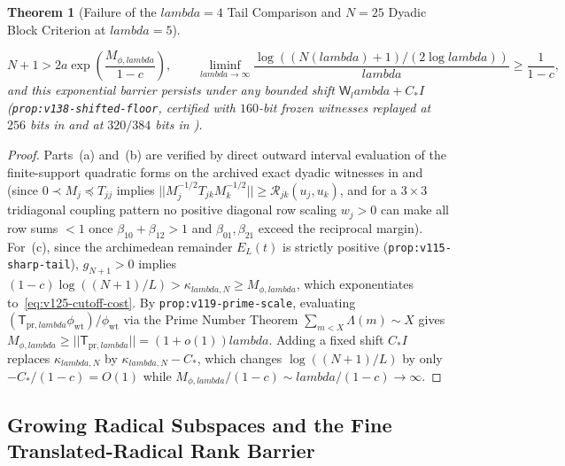 \documentclass[11pt]{article}
\def\lambda{lambda}%
\def\norm#1{||#1||}%
\newtheorem{theorem}{Theorem}[section]
\theoremstyle{remark}
\newcommand{\norm}[1]{\left\lVert #1\right\rVert}
\begin{document}
\begin{theorem}[Failure of the $\lambda = 4$ Tail Comparison and $N = 25$ Dyadic Block Criterion at $\lambda = 5$]
\begin{enumerate}[label=(\alph*)]
  \begin{equation}\label{eq:v125-cutoff-cost}
    N + 1 > 2a\exp\!\left(\frac{M_{\phi,\lambda}}{1-c}\right), \qquad \liminf_{\lambda\to\infty} \frac{\log((N(\lambda)+1)/(2\log\lambda))}{\lambda} \ge \frac{1}{1-c},
  \end{equation}
  and this exponential barrier persists under any bounded shift $\mathsf{W}_\lambda + C_* I$ (\texttt{prop:v138-\allowbreak shifted-\allowbreak floor}, certified with $160$-bit frozen witnesses replayed at $256$ bits in  and at $320/384$ bits in ).
\end{enumerate}
\end{theorem}
\begin{proof}
Parts~(a) and~(b) are verified by direct outward interval evaluation of the finite-support quadratic forms on the archived exact dyadic witnesses in  and  (since $0 \prec M_j \preceq T_{jj}$ implies $\norm{M_j^{-1/2}T_{jk}M_k^{-1/2}} \ge \mathcal{R}_{jk}(u_j,u_k)$, and for a $3\times 3$ tridiagonal coupling pattern no positive diagonal row scaling $w_j > 0$ can make all row sums $< 1$ once $\beta_{10} + \beta_{12} > 1$ and $\beta_{01},\beta_{21}$ exceed the reciprocal margin). For~(c), since the archimedean remainder $E_L(t)$ is strictly positive (\texttt{prop:v115-sharp-tail}), $g_{N+1} > 0$ implies $(1-c)\log((N+1)/L) > \kappa_{\lambda,N} \ge M_{\phi,\lambda}$, which exponentiates to~\eqref{eq:v125-cutoff-cost}. By \texttt{prop:v119-prime-scale}, evaluating $(\mathsf{T}_{\mathrm{pr},\lambda}\phi_{\mathrm{wt}})/\phi_{\mathrm{wt}}$ via the Prime Number Theorem $\sum_{m<X}\Lambda(m) \sim X$ gives $M_{\phi,\lambda} \ge \norm{\mathsf{T}_{\mathrm{pr},\lambda}} = (1 + o(1))\lambda$. Adding a fixed shift $C_* I$ replaces $\kappa_{\lambda,N}$ by $\kappa_{\lambda,N} - C_*$, which changes $\log((N+1)/L)$ by only $-C_*/(1-c) = O(1)$ while $M_{\phi,\lambda}/(1-c) \sim \lambda/(1-c) \to \infty$.
\end{proof}

\subsection{Growing Radical Subspaces and the Fine Translated-Radical Rank Barrier}
\end{document}
